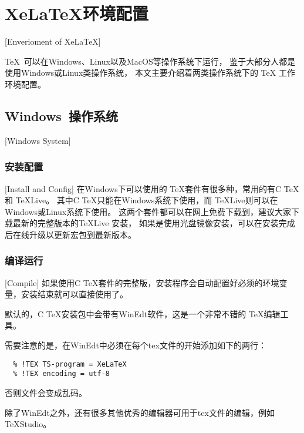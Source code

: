 
%
%
%

\chapter{XeLaTeX环境配置}[Enverioment of XeLaTeX]
\label{chap02}

\TeX{}~可以在Windows、Linux以及MacOS等操作系统下运行，
鉴于大部分人都是使用Windows或Linux类操作系统，
本文主要介绍着两类操作系统下的 \TeX{} 工作环境配置。

\section{Windows~操作系统}[Windows System]

\subsection{安装配置}[Install and Config]
在Windows下可以使用的 \TeX{}套件有很多种，常用的有C \TeX{}和 \TeX{}Live。
其中C \TeX{}只能在Windows系统下使用，而 \TeX{}Live则可以在Windows或Linux系统下使用。
这两个套件都可以在网上免费下载到，建议大家下载最新的完整版本的\TeX{}Live 安装，
如果是使用光盘镜像安装，可以在安装完成后在线升级以更新宏包到最新版本。

\subsection{编译运行}[Compile]
如果使用C \TeX{}套件的完整版，安装程序会自动配置好必须的环境变量，安装结束就可以直接使用了。

默认的，C \TeX{}安装包中会带有WinEdt软件，这是一个非常不错的 \TeX{}编辑工具。

需要注意的是，在WinEdt中必须在每个tex文件的开始添加如下的两行：
\begin{lstlisting}
  % !TEX TS-program = XeLaTeX
  % !TEX encoding = utf-8
\end{lstlisting}
否则文件会变成乱码。

除了WinEdt之外，还有很多其他优秀的编辑器可用于tex文件的编辑，例如TeXStudio。

